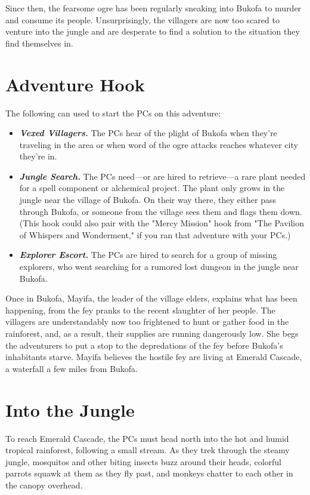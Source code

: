 \documentclass[10pt,a4paper,twoside,bg=print,twocolumn,openany,nodeprecatedcode]{dndbook}
\begin{document}
Since then, the fearsome ogre has been regularly sneaking into Bukofa to murder and consume its people. Unsurprisingly, the villagers are now too scared to venture into the jungle and are desperate to find a solution to the situation they find themselves in.

\section{Adventure Hook}
The following can used to start the PCs on this adventure:


\begin{itemize}
\item \textbf{\textit{Vexed Villagers.}} The PCs hear of the plight of Bukofa when they're traveling in the area or when word of the ogre attacks reaches whatever city they're in.
\item \textbf{\textit{Jungle Search.}} The PCs need—or are hired to retrieve—a rare plant needed for a spell component or alchemical project. The plant only grows in the jungle near the village of Bukofa. On their way there, they either pass through Bukofa, or someone from the village sees them and flags them down. (This hook could also pair with the "Mercy Mission" hook from "The Pavilion of Whispers and Wonderment," if you ran that adventure with your PCs.)
\item \textbf{\textit{Explorer Escort.}} The PCs are hired to search for a group of missing explorers, who went searching for a rumored lost dungeon in the jungle near Bukofa.
\end{itemize}

Once in Bukofa, Mayifa, the leader of the village elders, explains what has been happening, from the fey pranks to the recent slaughter of her people. The villagers are understandably now too frightened to hunt or gather food in the rainforest, and, as a result, their supplies are running dangerously low. She begs the adventurers to put a stop to the depredations of the fey before Bukofa's inhabitants starve. Mayifa believes the hostile fey are living at Emerald Cascade, a waterfall a few miles from Bukofa.

\section{Into the Jungle}
To reach Emerald Cascade, the PCs must head north into the hot and humid tropical rainforest, following a small stream. As they trek through the steamy jungle, mosquitos and other biting insects buzz around their heads, colorful parrots squawk at them as they fly past, and monkeys chatter to each other in the canopy overhead.
\end{document}
